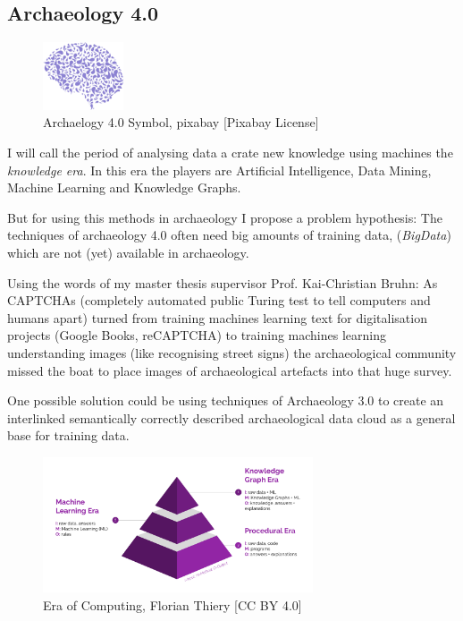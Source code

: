\documentclass[twocolumn]{autart}
\begin{document}
\subsection{Archaeology 4.0}

\begin{figure}[!htb]
\begin{center}
\includegraphics[height=2cm]{a40.png}   
\caption{Archaelogy 4.0 Symbol, pixabay [Pixabay License]}  
\label{figa40symbol}                         
\end{center}                             
\end{figure}

I will call the period of analysing data a crate new knowledge using machines the \textit{knowledge era}. In this era the players are Artificial Intelligence, Data Mining, Machine Learning and Knowledge Graphs.

But for using this methods in archaeology I propose a problem hypothesis: The techniques of archaeology 4.0 often need big amounts of training data, (\textit{BigData}) which are not (yet) available in archaeology.

Using the words of my master thesis supervisor Prof. Kai-Christian Bruhn: As CAPTCHAs (completely automated public Turing test to tell computers and humans apart) turned from training machines learning text for digitalisation projects (Google Books, reCAPTCHA) to training machines learning understanding images (like recognising street signs) the archaeological community missed the boat to place images of archaeological artefacts into that huge survey.

One possible solution could be using techniques of Archaeology 3.0 to create an interlinked semantically correctly described archaeological data cloud as a general base for training data.

\begin{figure}[!htb]
\begin{center}
\includegraphics[width=8cm]{Era_of_Computing.png}  
\caption{Era of Computing, Florian Thiery [CC BY 4.0]}  
\label{figeoc}                             
\end{center}                               
\end{figure}
\end{document}
